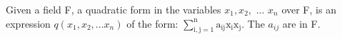 Given a field F, a quadratic form in the variables $x_{1}, x_{2},$ 
... $x_{n}$  over F, is an expression $q(x_{1},x_{2},...x_{n})$  of the form:
$ \sum _{\mathrm{i,j}=1} ^{\mathrm{n}} \mathrm{a}_{\mathrm{ij}} \mathrm{x}_{\mathrm{i}}
\mathrm{x}_{\mathrm{j}} . $ The $a_{ij}$  are in F.